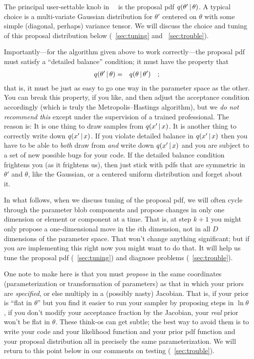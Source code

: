 \documentclass[12pt,twoside,pdftex]{article}
\newcommand{\MCMC}{\acronym{MCMC}}
\newcommand{\MH}{\acronym{M--H}}
\newcommand{\pars}{\theta}
\begin{document}
The principal user-settable knob in \MH\ \MCMC\ is the proposal
  pdf $q(\pars'\given\pars)$.
A typical choice is a multi-variate Gaussian distribution for $\pars'$
  centered on $\pars$ with some simple (diagonal, perhaps) variance
  tensor.
We will discuss the choice and tuning of this proposal distribution
  below (\sectionname~\ref{sec:tuning} and \sectionname~\ref{sec:trouble}).

Importantly---for the algorithm given above to work correctly---the
  proposal pdf must satisfy a ``detailed balance'' condition; it
  must have the property that
\begin{eqnarray}
q(\pars'\given\pars) &=& q(\pars\given\pars')
\quad ;
\end{eqnarray}
that is, it must be just as easy to go one way in the parameter space
  as the other.
You can break this property, if you like, and then adjust the
  acceptance condition accordingly (which is truly the Metropolis--Hastings algorithm), but we \emph{do not recommend this}
  except under the supervision of a trained professional.
The reason is:  It is one thing to draw samples from $q(x'\,|\, x)$.
It is another thing to correctly write down $q(x'\,|\, x)$.
  If you violate detailed balance in $q(x'\,|\, x)$ then you have to be
  able to \emph{both} draw from \emph{and} write down $q(x'\,|\, x)$
  and you are subject to a set of new possible bugs for your code.
If the detailed balance condition frightens you (as it frightens us),
  then just stick with pdfs that are symmetric in $\pars'$ and $\pars$,
  like the Gaussian, or a centered uniform distribution and forget about
  it.

In what follows, when we discuss tuning of the proposal pdf, we will
  often cycle through the parameter blob components and propose changes
  in only one dimension or element or component at a time.
That is, at step $k+1$ you might only propose a one-dimensional move
  in the $i$th dimension, not in all $D$ dimensions of the parameter
  space.
That won't change anything significant; but if you are implementing
  this right now you might want to do that.
It will help us tune the proposal pdf (\sectionname~\ref{sec:tuning})
and diagnose problems (\sectionname~\ref{sec:trouble}).

One note to make here
  is that you must \emph{propose}
  in the same coordinates (parameterization or transformation of parameters)
  as that in which your priors are \emph{specified},
  or else multiply in a (possibly nasty) Jacobian.
That is, if your prior is ``flat in $\pars$''
  but you find it easier to run your sampler by proposing steps in $\ln \pars$,
  if you don't modify your acceptance fraction by the Jacobian,
  your \emph{real} prior won't be flat in $\pars$.
These think-os can get subtle;
  the best way to avoid them
  is to write your code and your likelihood function
  and your prior pdf function and your proposal distribution
  all in precisely the same parameterization.
We will return to this point below in our comments on testing (\sectionname~\ref{sec:trouble}).
\end{document}
